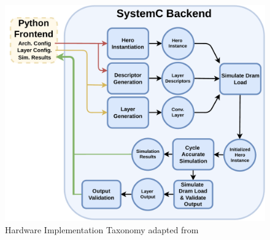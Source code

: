 \begin{figure}[ht]
    \centering
    \includegraphics[scale=0.58]{fig/hero-sim-backend.pdf}
    \caption{Hardware Implementation Taxonomy adapted from \cite{maestro}}
    \label{fig:hw_taxonomy}
\end{figure}





